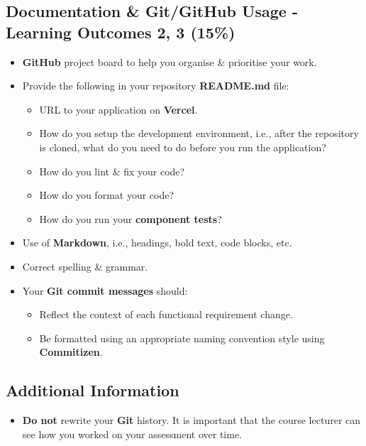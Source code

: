 \documentclass{article}
\begin{document}
\subsection*{Documentation \& Git/GitHub Usage - Learning Outcomes 2, 3 (15\%)}
\begin{itemize}
	\item \textbf{GitHub} project board to help you organise \& prioritise your work. 
	\item Provide the following in your repository \textbf{README.md} file:
	\begin{itemize}
		\item URL to your application on \textbf{Vercel}.
		\item How do you setup the development environment, i.e., after the repository is cloned, what do you need to do before you run the application?
		\item How do you lint \& fix your code?
		\item How do you format your code?
		\item How do you run your \textbf{component tests}?
	\end{itemize}
	\item Use of \textbf{Markdown}, i.e., headings, bold text, code blocks, etc.
	\item Correct spelling \& grammar. 
	\item Your \textbf{Git commit messages} should:
	\begin{itemize}
		\item Reflect the context of each functional requirement change.
		\item Be formatted using an appropriate naming convention style using \textbf{Commitizen}.
	\end{itemize}	
\end{itemize}

\subsection*{Additional Information}
\begin{itemize}
	\item \textbf{Do not} rewrite your \textbf{Git} history. It is important that the course lecturer can see how you worked on your assessment over time.
\end{itemize}
\end{document}

